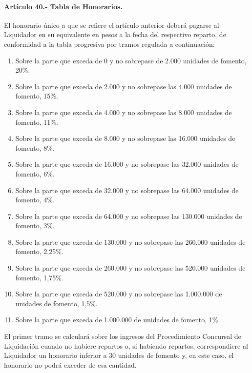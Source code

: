 \documentclass[
]{book}
\begin{document}
\hypertarget{artuxedculo-40.--tabla-de-honorarios.}{%
\paragraph*{Artículo 40.- Tabla de Honorarios.}\label{artuxedculo-40.--tabla-de-honorarios.}}

El honorario único a que se refiere el artículo anterior deberá pagarse al Liquidador en su equivalente en pesos a la fecha del respectivo reparto, de conformidad a la tabla progresiva por tramos regulada a continuación:

\begin{enumerate}
\def\labelenumi{\arabic{enumi})}
\item
  Sobre la parte que exceda de 0 y no sobrepase de 2.000 unidades de fomento, 20\%.
\item
  Sobre la parte que exceda de 2.000 y no sobrepase las 4.000 unidades de fomento, 15\%.
\item
  Sobre la parte que exceda de 4.000 y no sobrepase las 8.000 unidades de fomento, 11\%.
\item
  Sobre la parte que exceda de 8.000 y no sobrepase las 16.000 unidades de fomento, 8\%.
\item
  Sobre la parte que exceda de 16.000 y no sobrepase las 32.000 unidades de fomento, 6\%.
\item
  Sobre la parte que exceda de 32.000 y no sobrepase las 64.000 unidades de fomento, 4\%.
\item
  Sobre la parte que exceda de 64.000 y no sobrepase las 130.000 unidades de fomento, 3\%.
\item
  Sobre la parte que exceda de 130.000 y no sobrepase las 260.000 unidades de fomento, 2,25\%.
\item
  Sobre la parte que exceda de 260.000 y no sobrepase las 520.000 unidades de fomento, 1,75\%.
\item
  Sobre la parte que exceda de 520.000 y no sobrepase las 1.000.000 de unidades de fomento, 1,5\%.
\item
  Sobre la parte que exceda de 1.000.000 de unidades de fomento, 1\%.
\end{enumerate}

El primer tramo se calculará sobre los ingresos del Procedimiento Concursal de Liquidación cuando no hubiere repartos o, si habiendo repartos, correspondiere al Liquidador un honorario inferior a 30 unidades de fomento y, en este caso, el honorario no podrá exceder de esa cantidad.
\end{document}
